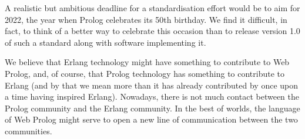 \documentclass{tlp}
\begin{document}
A realistic but ambitious deadline for a standardisation effort would be to aim for 2022, the year when Prolog celebrates its 50th birthday. We find it difficult, in fact, to think of a better way to celebrate this occasion than to release version 1.0 of such a standard along with software implementing it.

 

We believe that Erlang technology might have something to contribute to Web Prolog, and, of course, that Prolog technology has something to contribute to Erlang (and by that we mean more than it has already contributed by once upon a time having inspired Erlang). %
Nowadays, there is not much contact between the Prolog community and the Erlang community. In the best of worlds, the language of Web Prolog might serve to open a new line of communication between the two communities.

\vspace{-0mm}



\end{document}
